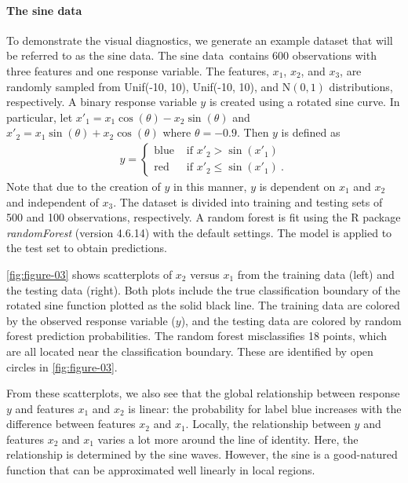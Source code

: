 \documentclass[AMS,STIX2COL]{WileyNJD-v2}\usepackage[]{graphicx}\usepackage[]{color}
\newcommand{\data}{sine data}
\begin{document}
\paragraph{The \data}

To demonstrate the visual diagnostics, we generate an example dataset that will be referred to as the \data. The \data \ contains 600 observations with three features and one response variable. The features, $x_1$, $x_2$, and $x_3$, are randomly sampled from Unif(-10, 10), Unif(-10, 10), and $\mbox{N}(0,1)$ distributions, respectively. A binary response variable $y$ is  created using a rotated sine curve. In particular, let $x'_1=x_1\cos(\theta)-x_2\sin(\theta)$ and $x'_2=x_1\sin(\theta)+x_2\cos(\theta)$ where $\theta=-0.9$. Then $y$ is defined as
\begin{eqnarray}\label{eq:data}
  y=\begin{cases}
  \mbox{blue} & \mbox{ if } x'_2 > \sin\left(x'_1\right) \\
  \mbox{red} & \mbox{ if } x'_2 \le \sin\left(x'_1\right) \ . %
  \end{cases}
\end{eqnarray}
Note that due to the creation of $y$ in this manner, $y$ is dependent on $x_1$ and $x_2$ and independent of $x_3$. The dataset is divided into training and testing sets of 500 and 100 observations, respectively.  A random forest  is fit using the R package \emph{randomForest} (version 4.6.14) \citep{liaw:2002} with the default settings. The model is applied to the test set to obtain predictions. 

\autoref{fig:figure-03} shows scatterplots of $x_2$ versus $x_1$ from the training data (left) and the testing data (right). Both plots include the true classification boundary of the rotated sine function plotted as the solid black line. The training data are colored by the observed response variable ($y$), and the testing data are colored by random forest  prediction probabilities. The random forest  misclassifies 18 points, which are all located near  the classification boundary. These are identified by open circles in \autoref{fig:figure-03}. 

From these scatterplots, we also see that the global relationship between response $y$ and features $x_1$ and $x_2$ is linear: the probability for label blue increases with the difference between features $x_2$ and $x_1$. Locally, the relationship between $y$ and features $x_2$ and $x_1$ varies a lot more around the line of identity. Here, the relationship is determined by the sine waves. However, the sine is a good-natured function that can be approximated well linearly in local regions.
\end{document}
